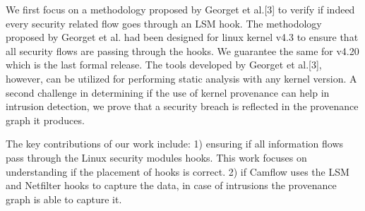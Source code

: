 We first focus on a methodology proposed by Georget et al.[3] to verify if indeed every security related flow goes through an LSM hook. The methodology proposed by Georget et al. had been designed for linux kernel v4.3 to ensure that all security flows are passing through the hooks. We guarantee the same for v4.20 which is the last formal release. The tools developed by Georget et al.[3], however, can be utilized for performing static analysis with any kernel version. A second challenge in determining if the use of kernel provenance can help in intrusion detection, we prove that a security breach is reflected in the provenance graph it produces. 
\vskip 0.1in

The key contributions of our work include: 1) ensuring if all information flows pass through the Linux security modules hooks. This work focuses on understanding if the placement of hooks is correct. 2) if Camflow uses the LSM and Netfilter hooks to capture the data, in case of intrusions the provenance graph is able to capture it. 
